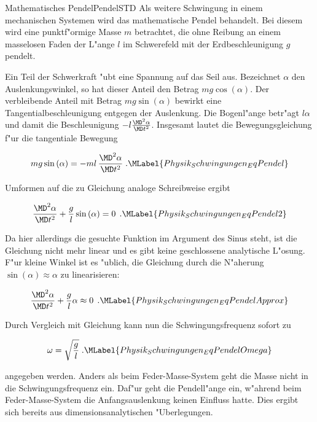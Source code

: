 \begin{MXContent}{Mathematisches Pendel}{Pendel}{STD}%
Als weitere Schwingung in einem mechanischen Systemen wird das mathematische Pendel behandelt. Bei diesem wird eine punktf"ormige Masse $m$ betrachtet, die ohne Reibung an einem masselosen Faden der L"ange $l$ im Schwerefeld mit der Erdbeschleunigung $g$ pendelt.

\begin{center}
\end{center}

Ein Teil der Schwerkraft "ubt eine Spannung auf das Seil aus. Bezeichnet $\alpha$ den Auslenkungswinkel, so hat dieser Anteil den Betrag $ m g \cos\left(\alpha\right)$. Der verbleibende Anteil mit Betrag $ m g \sin\left(\alpha\right)$ bewirkt eine Tangentialbeschleunigung entgegen der Auslenkung. Die Bogenl"ange betr"agt $l\alpha$ und damit die Beschleunigung $-l\frac{\MD^2\alpha }{\MD t^2}$. Insgesamt lautet die Bewegungsgleichung f"ur die tangentiale Bewegung

\begin{equation}
  m g \sin\left(\alpha\right) = - m l\, \frac{\MD^2\alpha }{\MD t^2}\; .\MLabel{Physik_Schwingungen_EqPendel}
\end{equation}

Umformen auf die zu Gleichung  analoge Schreibweise ergibt

\begin{equation}
  \frac{\MD^2\alpha }{\MD t^2} + \frac{g}{l} \sin\left(\alpha\right) = 0\, \; .\MLabel{Physik_Schwingungen_EqPendel2}
\end{equation}

Da hier allerdings die gesuchte Funktion im Argument des Sinus steht, ist die Gleichung nicht mehr linear und es gibt keine geschlossene analytische L"osung. F"ur kleine Winkel ist es "ublich, die Gleichung durch die N"aherung $\sin\left(\alpha\right)\approx\alpha$ zu linearisieren:

\begin{equation}
  \frac{\MD^2\alpha }{\MD t^2} + \frac{g}{l} \alpha \approx 0\, \; .\MLabel{Physik_Schwingungen_EqPendelApprox}
\end{equation}

Durch Vergleich mit Gleichung  kann nun die Schwingungsfrequenz sofort zu

\begin{equation}
  \omega = \sqrt{\frac{g}{l}} \; .\MLabel{Physik_Schwingungen_EqPendelOmega}
\end{equation}

angegeben werden. Anders als beim Feder-Masse-System geht die Masse nicht in die Schwingungsfrequenz ein. Daf"ur geht die Pendell"ange ein, w"ahrend beim Feder-Masse-System die Anfangsauslenkung keinen Einfluss hatte. Dies ergibt sich bereits aus dimensionsanalytischen "Uberlegungen.

\end{MXContent}


